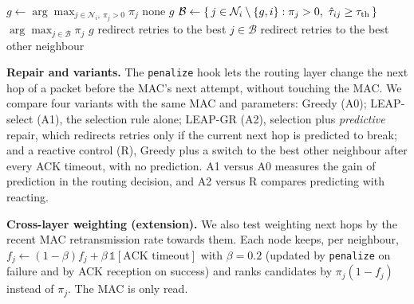 \begin{algorithm}[t]
\caption{LEAP-GR at node $i$ for a packet to $D$.}
\label{alg:leap}
\footnotesize
\begin{algorithmic}[1]
  \State $g \gets \arg\max_{j\in\mathcal N_i,\ \pi_j>0} \pi_j$ 
   \Return none 
  \EndIf
   \Return $g$
  \EndIf
  \State $\mathcal B \gets \{\,j\in\mathcal N_i\setminus\{g,i\} : \pi_j>0,\ \hat{\tau}_{ij}\ge\tau_{\mathrm{th}}\,\}$
   \Return $\arg\max_{j\in\mathcal B}\pi_j$ 
  \EndIf
  \State \Return $g$ 
\EndFunction
\Statex
{} 
   redirect retries to the best $j\in\mathcal B$
   redirect retries to the best other neighbour
  \EndIf
\EndFunction
\end{algorithmic}
\end{algorithm}

\textbf{Repair and variants.} The \texttt{penalize} hook lets the routing layer change the next hop of a
packet before the MAC's next attempt, without touching the MAC. We compare four variants with the same MAC
and parameters: Greedy (A0); LEAP-select (A1), the selection rule alone; LEAP-GR (A2), selection plus
\emph{predictive} repair, which redirects retries only if the current next hop is predicted to break; and
a reactive control (R), Greedy plus a switch to the best other neighbour after every ACK timeout, with no
prediction. A1 versus A0 measures the gain of prediction in the routing decision, and A2 versus R compares
predicting with reacting.

\textbf{Cross-layer weighting (extension).} We also test weighting next hops by the recent MAC retransmission
rate towards them. Each node keeps, per neighbour, $f_j\gets(1-\beta)f_j+\beta\,\mathbb 1[\text{ACK
timeout}]$ with $\beta=0.2$ (updated by \texttt{penalize} on failure and by ACK reception on success) and ranks
candidates by $\pi_j(1-f_j)$ instead of $\pi_j$. The MAC is only read.
